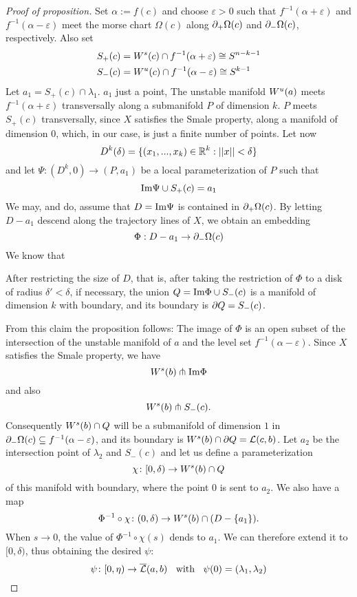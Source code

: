 \begin{proof}[Proof of proposition]
    Set $\alpha := f(c)$ and choose $\varepsilon > 0$ such that $f^{-1}(\alpha + \varepsilon)$
    and $f^{-1}(\alpha - \varepsilon)$ meet the morse chart $\Omega(c)$ along ${ \partial }_+\Omega(c)$
    and ${ \partial }_-\Omega(c)$, respectively. Also set
    \begin{align*}
        S_+(c) & = { W^s } (c) \cap f^{-1}(\alpha + \varepsilon) \cong S^{n - k - 1} \\
        S_-(c) & = { W^u } (c) \cap f^{-1}(\alpha - \varepsilon) \cong S^{k - 1}
    \end{align*}
    Let $a_1 = S_+(c) \cap \lambda_1$. $a_1$ just a point, The unstable manifold ${ W^u } (a)$ meets 
    $f^{-1}(\alpha + \varepsilon)$ transversally along a submanifold $P$ of dimension $k$. $P$
    meets $S_+(c)$ transversally, since $X$ satisfies the Smale property, along a manifold of
    dimension $0$, which, in our case, is just a finite number of points. Let now 
    \[ D^k(\delta) = \{ (x_1, ..., x_k) \in { \mathbb R }^k : ||x|| < \delta \} \]
    and let $\Psi \colon (D^k, 0) \to (P, a_1)$ be a local parameterization of $P$ such that
    \[ { \operatorname{Im} } \Psi \cup S_+(c) = a_1 \]
    We may, and do, assume that $D = { \operatorname{Im} } \Psi$ is contained in ${ \partial }_+\Omega(c)$.
    By letting $D - {a_1}$ descend along the trajectory lines of $X$, we obtain an embedding
    \[ \Phi: D - {a_1} \to { \partial }_- \Omega (c) \]
    We know that 
    \begin{claim*}
        After restricting the size of $D$, that is, after taking the restriction of $\Phi$ to 
        a disk of radius $\delta' < \delta$, if necessary, the union $Q = { \operatorname{Im} } \Phi \cup S_- (c)$
        is a manifold of dimension $k$ with boundary, and its boundary is ${ \partial } Q = S_- (c)$.
    \end{claim*}
    From this claim the proposition follows: The image of $\Phi$ is an open subset of the intersection 
    of the unstable manifold of $a$ and the level set $f^{-1}(\alpha - \varepsilon)$. Since $X$ 
    satisfies the Smale property, we have 
    \[ { W^s } (b) \pitchfork { \operatorname{Im} } \Phi \]
    and also 
    \[ { W^s } (b) \pitchfork S_- (c) . \]
    Consequently ${ W^s } (b) \cap Q$ will be a submanifold of dimension $1$ in 
    ${ \partial }_- \Omega (c) \subseteq f^{-1}(\alpha - \varepsilon)$, and its boundary is 
    ${ W^s } (b) \cap { \partial } Q = { \mathcal{L} } (c, b)$. 
    Let $a_2$ be the intersection point of $\lambda_2$ and $S_-(c)$ and let us define a 
    parameterization
    \[ \chi \colon [0, \delta) \to { W^s } (b) \cap Q \]
    of this manifold with boundary, where the point $0$ is sent to $a_2$. We also have a map 
    \[ \Phi^{-1} \circ \chi \colon (0, \delta) \to { W^s } (b) \cap (D - \{ a_1 \}) . \]
    When $s \to 0$, the value of $\Phi^{-1} \circ \chi (s)$ dends to $a_1$. We can 
    therefore extend it to $[0, \delta)$, thus obtaining the desired $\psi$:
    \[ 
        \psi \colon [0, \eta) \to {\overline{\mathcal{L}} } (a, b) \;\; \text{ with } \;\; 
        \psi (0) = (\lambda_1, \lambda_2) 
    \]
\end{proof}
